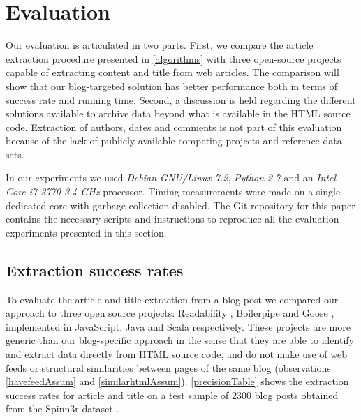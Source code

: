\section{Evaluation}

Our evaluation is articulated in two parts. First, we compare the article extraction procedure presented in \autoref{algorithms} with three open-source projects capable of extracting content and title from web articles. The comparison will show that our blog-targeted solution has better performance both in terms of success rate and running time. Second, a discussion is held regarding the different solutions available to archive data beyond what is available in the HTML source code. Extraction of authors, dates and comments is not part of this evaluation because of the lack of publicly available competing projects and reference data sets.

In our experiments we used \emph{Debian GNU/Linux 7.2}, \emph{Python 2.7} and an \emph{Intel Core i7-3770 3.4 GHz} processor. Timing measurements were made on a single dedicated core with garbage collection disabled. The Git repository for this paper \cite{repositoryofthispaper} contains the necessary scripts and instructions to reproduce all the evaluation experiments presented in this section.


\subsection{Extraction success rates}
To evaluate the article and title extraction from a blog post we compared our approach to three open source projects: Readability \cite{python-readability2011}, Boilerpipe \cite{kohlschuetter2010} and Goose \cite{goose2012}, implemented in JavaScript, Java and Scala respectively. These projects are more generic than our blog-specific approach in the sense that they are able to identify and extract data directly from HTML source code, and do not make use of web feeds or structural similarities between pages of the same blog (observations \ref{havefeedAssum} and \ref{similarhtmlAssum}). \autoref{precisionTable} shows the extraction success rates for article and title on a test sample of 2300 blog posts obtained from the Spinn3r dataset \cite{burton2011}.


